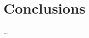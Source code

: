 \documentclass[12pt]{report}
\begin{document}
	\newpage

	\section{Conclusions}

	\dots

	\nocite{*}
	
	\normalsize

 

\end{document}

